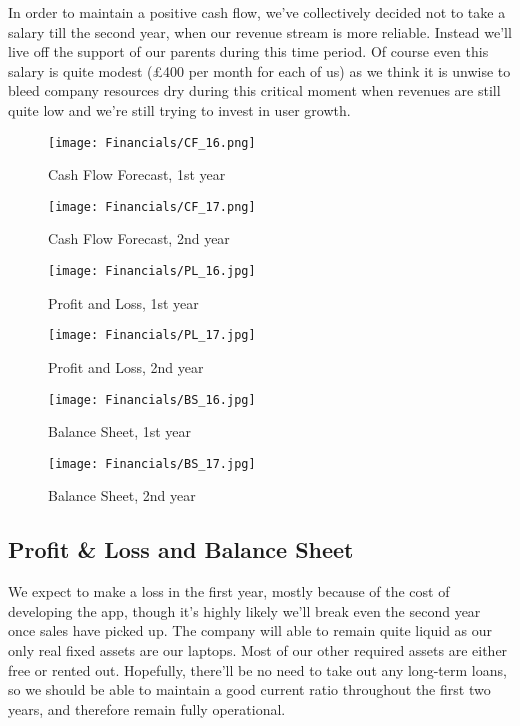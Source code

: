 \documentclass[12pt]{article}
\begin{document}
In order to maintain a positive cash flow, we've collectively decided not to take a salary till the second year, when our revenue stream is more reliable. Instead we'll live off the support of our parents during this time period.  Of course even this salary is quite modest (£400 per month for each of us) as we think it is unwise to bleed company resources dry during this critical moment when revenues are still quite low and we're still trying to invest in user growth.

\begin{landscape}

    \begin{figure}
        \centering
        \texttt{[image: Financials/CF\_16.png]}
        \caption{Cash Flow Forecast, 1st year}
        \label{fig:CF16}
    \end{figure}

    \begin{figure}
        \centering
        \texttt{[image: Financials/CF\_17.png]}
        \caption{Cash Flow Forecast, 2nd year}
        \label{fig:CF17}
    \end{figure}
    
\end{landscape}

\begin{figure}[!hp]
    \centering
    \texttt{[image: Financials/PL\_16.jpg]}
    \caption{Profit and Loss, 1st year}
    \label{fig:PL16}
\end{figure}

\begin{figure}[!hp]
    \centering
    \texttt{[image: Financials/PL\_17.jpg]}
    \caption{Profit and Loss, 2nd year}
    \label{fig:PL17}
\end{figure}

\begin{figure}[!hp]
    \centering
    \texttt{[image: Financials/BS\_16.jpg]}
    \caption{Balance Sheet, 1st year}
    \label{fig:BS16}
\end{figure}

\begin{figure}[!hp]
    \centering
    \texttt{[image: Financials/BS\_17.jpg]}
    \caption{Balance Sheet, 2nd year}
    \label{fig:BS17}
\end{figure}

\subsection{Profit \& Loss and Balance Sheet}
We expect to make a loss in the first year, mostly because of the cost of developing the app, though it’s highly likely we’ll break even the second year once sales have picked up.
The company will able to remain quite liquid as our only real fixed assets are our laptops. Most of our other required assets are either free or rented out. Hopefully, there’ll be no need to take out any long-term loans, so we should be able to maintain a good current ratio throughout the first two years, and therefore remain fully operational.
\end{document}
